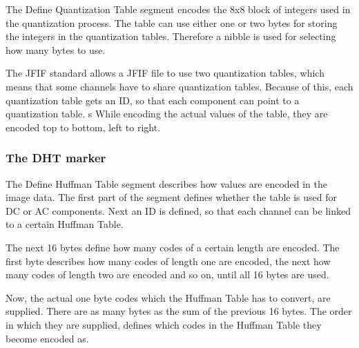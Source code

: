 \begin{infobox}
The Define Quantization Table segment encodes the 8x8 block of integers used in the quantization process. 
The table can use either one or two bytes for storing the integers in the quantization tables. 
Therefore a nibble is used for selecting how many bytes to use.

The JFIF standard allows a JFIF file to use two quantization tables, which means that some channels have to share quantization tables. 
Because of this, each quantization table gets an ID, so that each component can point to a quantization table. 
s
While encoding the actual values of the table, they are encoded top to bottom, left to right.


\subsubsection*{The DHT marker}
\begin{centering}
\end{centering}

The Define Huffman Table segment describes how values are encoded in the image data. 
The first part of the segment defines whether the table is used for DC or AC components. Next an ID is defined, so that each channel can be linked to a certain Huffman Table.

The next 16 bytes define how many codes of a certain length are encoded. 
The first byte describes how many codes of length one are encoded, the next how many codes of length two are encoded and so on, until all 16 bytes are used. 

Now, the actual one byte codes which the Huffman Table has to convert, are supplied.
There are as many bytes as the sum of the previous 16 bytes. 
The order in which they are supplied, defines which codes in the Huffman Table they become encoded as.


\end{infobox}

